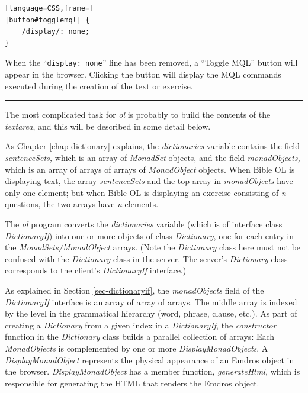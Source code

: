 \documentclass[11pt,oneside,a4paper]{memoir}
\begin{document}
\begin{lstlisting}[language=CSS,frame=]
|button#togglemql| {
    /display/: none;
}
\end{lstlisting}

When the ``\texttt{display:~none}'' line has been removed, a ``Toggle MQL'' button will appear in
the browser. Clicking the button will display the MQL commands executed during the creation of the
text or exercise.

\pfbreak

The most complicated task for \emph{ol} is probably to build the contents of the \emph{textarea},
and this will be described in some detail below.

As Chapter \ref{chap-dictionary} explains, the \emph{dictionaries} variable contains the field
\emph{sentenceSets,} which is an array of \emph{MonadSet}%
objects, and the field \emph{monadObjects,} which is an array of arrays of arrays of
\emph{MonadObject}%
objects. When Bible OL is displaying text, the array \emph{sentenceSets} and the top array in
\emph{monadObjects} have only one element; but when Bible OL is displaying an exercise consisting of
\emph{n} questions, the two arrays have \emph{n} elements.

The \emph{ol} program converts the \emph{dictionaries}%
variable (which is of interface class \emph{DictionaryIf})%
into one or more objects of class \emph{Dictionary},%
one for each entry in the \emph{MonadSets/MonadObject} arrays. (Note the \emph{Dictionary} class
here must not be confused with the \emph{Dictionary} class in the server. The server's
\emph{Dictionary} class corresponds to the client's \emph{DictionaryIf} interface.)

As explained in Section \ref{sec-dictionaryif}, the \emph{monadObjects} field of the
\emph{DictionaryIf} interface is an array of array of arrays. The middle array is indexed by the
level in the grammatical hierarchy (word, phrase, clause, etc.). As part of
creating a \emph{Dictionary} from a given index in a \emph{DictionaryIf}, the \emph{constructor}
function in the \emph{Dictionary} class builds a parallel collection of arrays: Each
\emph{MonadObjects} is complemented by one or more \emph{DisplayMonadObjects}.%
A \emph{DisplayMonadObject} represents the physical appearance of an Emdros object in the browser.
\emph{DisplayMonadObject} has a member function, \emph{generateHtml,} which is responsible for
generating the HTML that renders the Emdros object.
\end{document}
